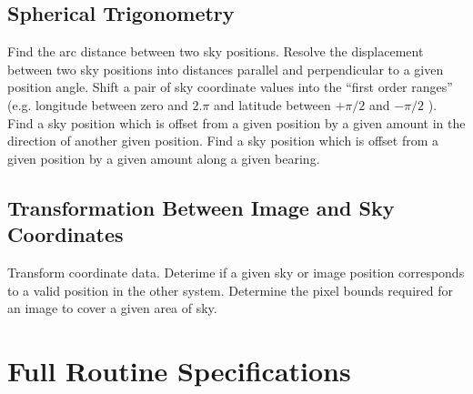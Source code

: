 \subsection {Spherical Trigonometry}
   {Find the arc distance between two sky positions.}
   {Resolve the displacement between two sky positions into distances parallel
    and perpendicular to a given position angle.}
   {Shift a pair of sky coordinate values into the ``first order ranges'' (e.g.
   longitude between zero and $2.\pi$ and latitude between $+\pi/2$ and
   $-\pi/2$ ).}
   {Find a sky position which is offset from a given position by a given
   amount in the direction of another given position.}
   {Find a sky position which is offset from a given position by a given
   amount along a given  bearing.}

\subsection {Transformation Between Image and Sky Coordinates}
   {Transform coordinate data.}
   {Deterime if a given sky or image position corresponds to a valid position
    in the other system.}
   {Determine the pixel bounds required for an image to cover a given area of
    sky.}

\section {Full Routine Specifications}
\label {SEC:FULLSPEC}

\renewcommand{\_}{{\tt\char'137}}







